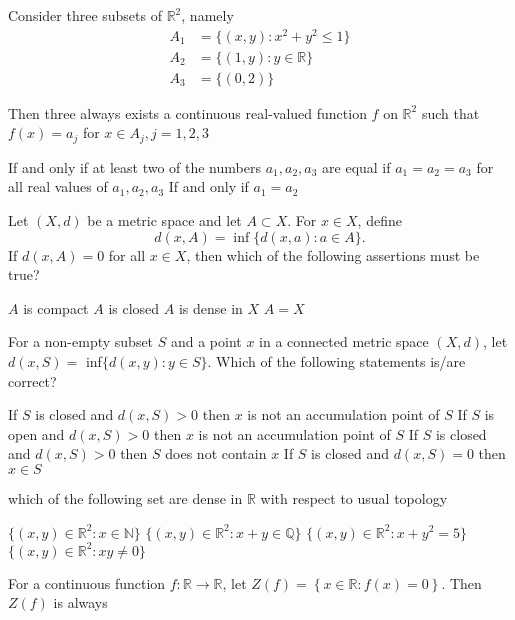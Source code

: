 \documentclass[10pt]{exam}
\newcommand{\N}{\ensuremath{\mathbb{N}}}
\newcommand{\R}{\ensuremath{\mathbb{R}}}
\newcommand{\Q}{\ensuremath{\mathbb{Q}}}
\newcommand{\set}[1]{\ensuremath{\{#1\}}}
\begin{document}
\begin{questions}
\question 
Consider three subsets of $\R^2$, namely 
\begin{align*}
A_1 &= \set{(x,y): x^2 + y^2 \leq 1}\\
A_2 &= \set{(1,y): y \in \R }\\
A_3 &= \set{(0,2)}
\end{align*}
 
 Then three always exists a continuous real-valued function $f$ on $\R^2$ such that $f(x) = a_j$ for $x \in A_j, j= 1,2,3$ 
 
 \begin{checkboxes}
 \choice If and only if at least two of the numbers $a_1, a_2, a_3$ are equal 
 \choice if $a_1 = a_2 = a_3 $
 \choice for all real values of  $a_1, a_2, a_3 $
 \choice If and only if  $a_1= a_2 $
 \end{checkboxes}
\question
Let $(X,d)$ be a metric space and let $A \subset X$. For $x \in X$, define
$$d(x,A)= \inf \{d(x,a): a \in A\}.$$
If $d(x,A)=0$ for all $x \in X$, then which of the following assertions must be true?
\begin{choices}
\choice $A$ is compact 		
\choice $A$ is closed 
\choice $A$ is dense in $X$ 
\choice $A=X$
\end{choices}

\question 
For a non-empty subset $S$ and a point $x$ in a connected metric space $(X, d)$, let $d(x,S) =$ inf$\{d(x,y): y \in S\}$. Which of the following statements is/are correct?

\begin{checkboxes}
\choice If $S$ is closed and $d(x,S) > 0$ then $x$ is not an accumulation point of $S$ 
\choice If $S$ is open and $d(x,S) > 0$ then $x$ is not an accumulation point of $S$ 
\choice If $S$ is closed  and $d(x,S) > 0$ then $S$ does  not contain  $x$ 
\choice If $S$ is closed  and $d(x,S) = 0$ then $x \in S$
\end{checkboxes} 


\question
which of the following set are dense in $\R$ with respect to usual topology

\begin{checkboxes}
\choice $\{(x,y)\in \R^2: x \in \N \}$ 
\choice $\{(x,y)\in \R^2: x+y \in \Q \}$ 
\choice $\{(x,y)\in \R^2: x+y^2=5 \}$ 
\choice $\{(x,y)\in \R^2: xy \neq 0 \}$ 
\end{checkboxes}
\question
For a continuous function $f: \R \rightarrow \R$, let $Z(f) = \left \{x \in \R: f(x) = 0 \right \}$. Then $Z(f)$ is always


\end{questions}
\end{document}
